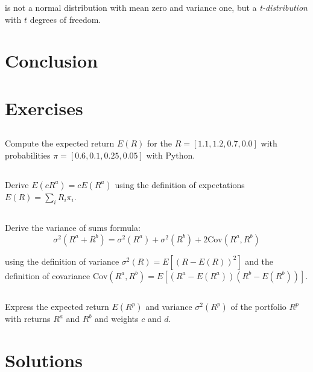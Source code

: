 is not a normal distribution with mean zero and variance 
one, but a \textit{t-distribution} with $t$ degrees of freedom.


\section{Conclusion}

\newpage
\section{Exercises}

\subsection{}

Compute the expected return $E(R)$ for the 
$R = [1.1, 1.2, 0.7, 0.0]$ with probabilities
$\pi = [0.6, 0.1, 0.25, 0.05]$ with Python.

\subsection{}

Derive $E(cR^a) = cE(R^a)$ using the 
definition of expectations $E(R) = \sum_i R_i \pi_i$.

\subsection{}

Derive the variance of sums formula:
\begin{equation}
    \sigma^2(R^a + R^b) = \sigma^2(R^a) + \sigma^2(R^b) + 2\text{Cov}(R^a, R^b)
\end{equation}

using the definition of variance $\sigma^2(R) = E[(R - E(R))^2]$ and
the definition of covariance $\text{Cov}(R^a, R^b) = E[(R^a - E(R^a))(R^b - E(R^b))]$.



\subsection{}

Express the expected return $E(R^p)$ 
and variance $\sigma^2(R^p)$ of the
portfolio $R^p$ with returns $R^a$ and $R^b$
and weights $c$ and $d$.

\newpage
\section{Solutions}

